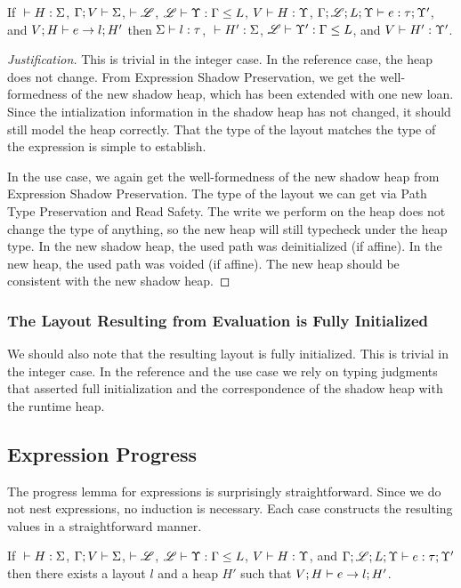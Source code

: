 \begin{conj}
  If ${} \vdash {H} : {\Sigma}$, $\Gamma;V\vdash\Sigma$, $\vdash\mathscr{L}$, ${\mathscr{L}} \vdash {\Upsilon} : {\Gamma} \leq {L}$, 
  ${V} \vdash {H} : {\Upsilon}$, ${\Gamma;\mathscr{L};L;\Upsilon} \vdash {e} : {\tau;\Upsilon'}$, and ${V;H} \vdash {e} \to {l;H'}$
  then ${\Sigma} \vdash {l} : {\tau}$, ${} \vdash {H'} : {\Sigma}$, ${\mathscr{L}} \vdash {\Upsilon'} : {\Gamma} \leq {L}$, and ${V} \vdash {H'} : {\Upsilon'}$.
\end{conj}

\begin{proof}[Justification]
  This is trivial in the integer case.
  In the reference case, the heap does not change.
  From Expression Shadow Preservation, we get the well-formedness of the new shadow heap,
  which has been extended with one new loan. Since the intialization information in the shadow
  heap has not changed, it should still model the heap correctly.
  That the type of the layout matches the type of the expression is simple to establish.

  In the use case, we again get the well-formedness of the new shadow heap from
  Expression Shadow Preservation. The type of the layout we can get via 
  Path Type Preservation and Read Safety. The write we perform on the heap
  does not change the type of anything, so the new heap will still typecheck under the heap type.
  In the new shadow heap, the used path was deinitialized (if affine).
  In the new heap, the used path was voided (if affine).
  The new heap should be consistent with the new shadow heap.
\end{proof}

\subsubsection*{The Layout Resulting from Evaluation is Fully Initialized}
We should also note that the resulting layout is fully initialized.
This is trivial in the integer case. In the reference and the use case
we rely on typing judgments that asserted full initialization and the correspondence
of the shadow heap with the runtime heap.

\subsection*{Expression Progress}
The progress lemma for expressions is surprisingly straightforward.
Since we do not nest expressions, no induction is necessary.
Each case constructs the resulting values in a straightforward manner.

\begin{conj}
  If ${} \vdash {H} : {\Sigma}$, $\Gamma;V\vdash\Sigma$, $\vdash\mathscr{L}$, ${\mathscr{L}} \vdash {\Upsilon} : {\Gamma} \leq {L}$,
  ${V} \vdash {H} : {\Upsilon}$, and ${\Gamma;\mathscr{L};L;\Upsilon} \vdash {e} : {\tau;\Upsilon'}$
  then there exists a layout $l$ and a heap $H'$ such that ${V;H} \vdash {e} \to {l;H'}$.
\end{conj}

